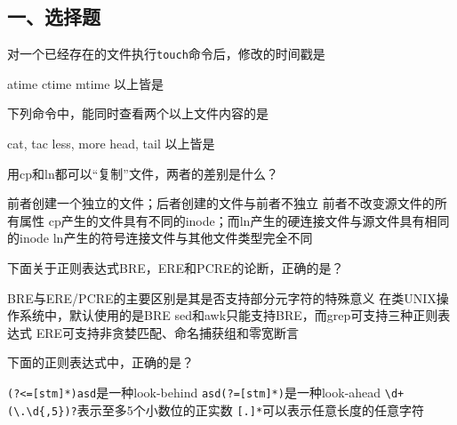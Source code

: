 \documentclass[addpoints,12pt,answers]{exam}
\begin{document}
\begin{CJK*}{UTF8}{gbsn}

\vspace{0.1in}


\vspace{0.1in}


\section*{一、选择题}

\begin{questions}

\question[1]
对一个已经存在的文件执行\texttt{touch}命令后，修改的时间戳是
\begin{choices}
	\choice atime
	\choice ctime
	\choice mtime
	\choice 以上皆是
\end{choices}
\answerline


\question[1]
下列命令中，能同时查看两个以上文件内容的是
\begin{choices}
	\choice cat, tac
	\choice less, more
	\choice head, tail
	\choice 以上皆是
\end{choices}
\answerline

\question[1]
用cp和ln都可以“复制”文件，两者的差别是什么？
\begin{choices}
	\choice 前者创建一个独立的文件；后者创建的文件与前者不独立
	\choice 前者不改变源文件的所有属性
	\choice cp产生的文件具有不同的inode；而ln产生的硬连接文件与源文件具有相同的inode 
	\choice ln产生的符号连接文件与其他文件类型完全不同
\end{choices}
\answerline

\question[1]
下面关于正则表达式BRE，ERE和PCRE的论断，正确的是？
\begin{choices}
	\choice BRE与ERE/PCRE的主要区别是其是否支持部分元字符的特殊意义
	\choice 在类UNIX操作系统中，默认使用的是BRE
	\choice sed和awk只能支持BRE，而grep可支持三种正则表达式
	\choice ERE可支持非贪婪匹配、命名捕获组和零宽断言
\end{choices}
\answerline

\question[1]
下面的正则表达式中，正确的是？
\begin{choices}
	\choice \lstinline|(?<=[stm]*)asd|是一种look-behind
	\choice \lstinline|asd(?=[stm]*)|是一种look-ahead
	\choice	\lstinline|\d+(\.\d{,5})?|表示至多5个小数位的正实数
	\choice \lstinline|[.]*|可以表示任意长度的任意字符
\end{choices}
\answerline


\end{questions}
\end{CJK*}
\end{document}
